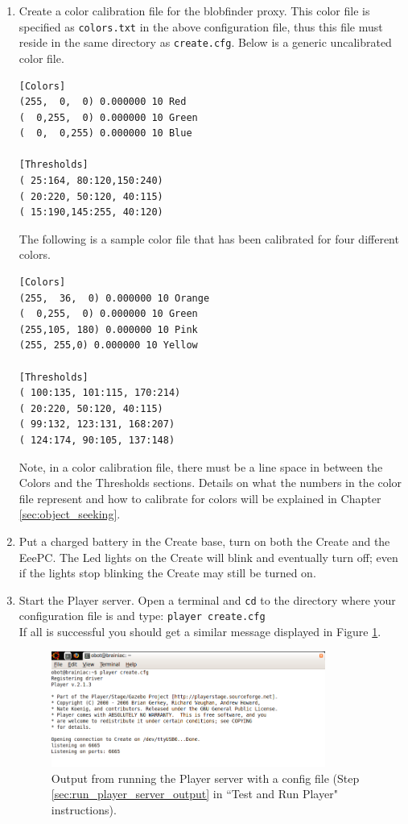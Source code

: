\begin{enumerate}
\item Create a color calibration file for the blobfinder proxy. This color file is specified as \texttt{colors.txt} in the above configuration file, thus this file must reside in the same directory as \texttt{create.cfg}. Below is a generic uncalibrated color file.

\begin{verbatim}
[Colors]
(255,  0,  0) 0.000000 10 Red
(  0,255,  0) 0.000000 10 Green
(  0,  0,255) 0.000000 10 Blue

[Thresholds]
( 25:164, 80:120,150:240)
( 20:220, 50:120, 40:115)
( 15:190,145:255, 40:120)
\end{verbatim}

The following is a sample color file that has been calibrated for four different colors.

\begin{verbatim}
[Colors]
(255,  36,  0) 0.000000 10 Orange
(  0,255,  0) 0.000000 10 Green
(255,105, 180) 0.000000 10 Pink
(255, 255,0) 0.000000 10 Yellow

[Thresholds]
( 100:135, 101:115, 170:214)
( 20:220, 50:120, 40:115)
( 99:132, 123:131, 168:207)
( 124:174, 90:105, 137:148)
\end{verbatim}
Note, in a color calibration file, there must be a line space in between the Colors and the Thresholds sections. Details on what the numbers in the color file represent and how to calibrate for colors will be explained in Chapter \ref{sec:object_seeking}.

\item Put a charged battery in the Create base, turn on both the Create and the EeePC. The Led lights on the Create will blink and eventually turn off; even if the lights stop blinking the Create may still be turned on.

\item Start the Player server. Open a terminal and \texttt{cd} to the directory where your configuration file is and type: \texttt{player create.cfg}\\
\label{sec:run_player_server_output}If all is successful you should get a similar message displayed in Figure \ref{fig:player_on}.

\begin{figure}[!h]
\centering
\includegraphics[width=0.85\textwidth]{figures/2_player_on.png}
\caption{Output from running the Player server with a config file (Step \ref{sec:run_player_server_output} in ``Test and Run Player" instructions).}
\label{fig:player_on}
\end{figure}


\end{enumerate}
